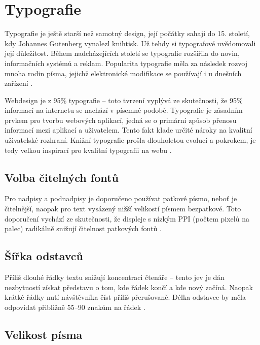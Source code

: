 \section{Typografie}
\label{sec:typografie}

\begin{quote}
     \cite{9}
\end{quote}

\noindent
Typografie je ještě starší než samotný design, její počátky sahají do 15. století, kdy Johannes Gutenberg vynalezl knihtisk. Už tehdy si typografové uvědomovali její důležitost. Během nadcházejících století se typografie rozšířila do novin, informačních systémů a reklam. Popularita typografie měla za následek rozvoj mnoha rodin písma, jejichž elektronické modifikace se používají i u dnešních zařízení \cite{1}.

Webdesign je z 95\% typografie -- toto tvrzení vyplývá ze skutečnosti, že 95\% informací na internetu se nachází v písemné podobě. Typografie je zásadním prvkem pro tvorbu webových aplikací, jedná se o primární způsob přenosu informací mezi aplikací a uživatelem. Tento fakt klade určité nároky na kvalitní uživatelské rozhraní. Knižní typografie prošla dlouholetou evolucí a pokrokem, je tedy velkou inspirací pro kvalitní typografii na webu \cite{7} \cite{12}.

\subsection{Volba čitelných fontů}

Pro nadpisy a podnadpisy je doporučeno používat patkové písmo, neboť je čitelnější, naopak pro text vysázený nižší velikostí písmem bezpatkové. Toto doporučení vychází ze skutečnosti, že displeje s nízkým PPI (počtem pixelů na palec) radikálně snižují čitelnost patkových fontů \cite{10}.

\subsection{Šířka odstavců}

Příliš dlouhé řádky textu snižují koncentraci čtenáře -- tento jev je dán nezbytností získat představu o tom, kde řádek končí a kde nový začíná. Naopak krátké řádky nutí návštěvníka číst příliš přerušovaně. Délka odstavce by měla odpovídat přibližně 55--90 znakům na řádek \cite{10}.

\subsection{Velikost písma}

